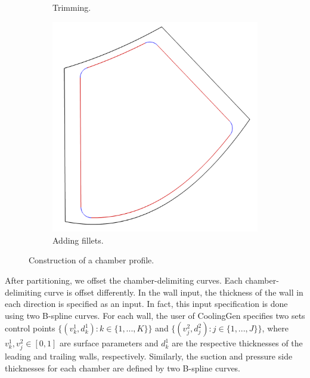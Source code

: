\documentclass[a4paper, 11pt]{report}
\theoremstyle{definition}
\begin{document}
\begin{figure}[H]
\begin{subfigure}{.32\textwidth}
			\caption{Trimming.}
		\end{subfigure}
		\begin{subfigure}{.32\textwidth}
			\includegraphics[width=\textwidth]{../tec/chambers/13.png}
			\caption{Adding fillets.}
		\end{subfigure}
		\caption{Construction of a chamber profile.}
		\label{fig:chamber_shrinking}
	\end{figure}

	After partitioning, we offset the chamber-delimiting curves. Each chamber-delimiting curve is offset differently. In the wall input, the thickness of the wall in each direction is specified as an input. In fact, this input specification is done using two B-spline curves. For each wall, the user of CoolingGen specifies two sets control points $\{(v^1_k, d^1_k) : k \in \{1, ..., K\}\}$ and $\{(v^2_j, d^2_j) : j \in \{1, ..., J\}\}$, where $v^1_k, v^2_j \in [0,1]$ are surface parameters and $d^1_k$ are the respective thicknesses of the leading and trailing walls, respectively. Similarly, the suction and pressure side thicknesses for each chamber are defined by two B-spline curves.
\end{document}
